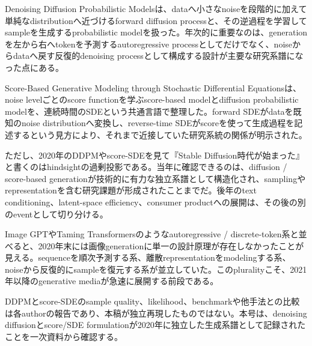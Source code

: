 
Denoising Diffusion Probabilistic Modelsは、dataへ小さなnoiseを段階的に加えて単純なdistributionへ近づけるforward diffusion processと、その逆過程を学習してsampleを生成するprobabilistic modelを扱った。年次的に重要なのは、generationを左から右へtokenを予測するautoregressive processとしてだけでなく、noiseからdataへ戻す反復的denoising processとして構成する設計が主要な研究系譜になった点にある。\autocite{src-d6e451e5085e}


Score-Based Generative Modeling through Stochastic Differential Equationsは、noise levelごとのscore functionを学ぶscore-based modelとdiffusion probabilistic modelを、連続時間のSDEという共通言語で整理した。forward SDEがdataを既知のnoise distributionへ変換し、reverse-time SDEがscoreを使って生成過程を記述するという見方により、それまで近接していた研究系統の関係が明示された。\autocite{src-c012a248ff78}


ただし、2020年のDDPMやscore-SDEを見て『Stable Diffusion時代が始まった』と書くのはhindsightの過剰投影である。当年に確認できるのは、diffusion / score-based generationが技術的に有力な独立系譜として構造化され、samplingやrepresentationを含む研究課題が形成されたことまでだ。後年のtext conditioning、latent-space efficiency、consumer productへの展開は、その後の別のeventとして切り分ける。\autocite{src-c012a248ff78,src-d6e451e5085e}


Image GPTやTaming Transformersのようなautoregressive / discrete-token系と並べると、2020年末には画像generationに単一の設計原理が存在しなかったことが見える。sequenceを順次予測する系、離散representationをmodelingする系、noiseから反復的にsampleを復元する系が並立していた。このpluralityこそ、2021年以降のgenerative mediaが急速に展開する前段である。\autocite{src-c012a248ff78,src-d6e451e5085e}


\begin{claimboundary}
DDPMとscore-SDEのsample quality、likelihood、benchmarkや他手法との比較は各authorの報告であり、本稿が独立再現したものではない。本号は、denoising diffusionとscore/SDE formulationが2020年に独立した生成系譜として記録されたことを一次資料から確認する。\autocite{src-c012a248ff78,src-d6e451e5085e}
\end{claimboundary}
